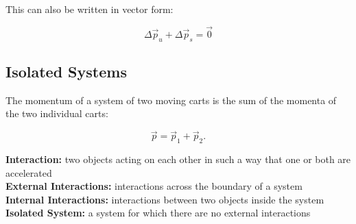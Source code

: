             This can also be written in vector form:

            \[
                \Delta \overrightarrow{p}_u + \Delta \overrightarrow{p}_s = \overrightarrow{0}
            \]



        \subsection{Isolated Systems}

            The momentum of a system of two moving carts is the sum of the momenta of the two individual carts:

            \[
                \overrightarrow{p} = \overrightarrow{p}_1 + \overrightarrow{p}_2.
            \]

            \textbf{Interaction:} two objects acting on each other in such a way that one or both are accelerated \\
            \textbf{External Interactions:} interactions across the boundary of a system \\
            \textbf{Internal Interactions:} interactions between two objects inside the system \\
            \textbf{Isolated System:} a system for which there are no external interactions \\

